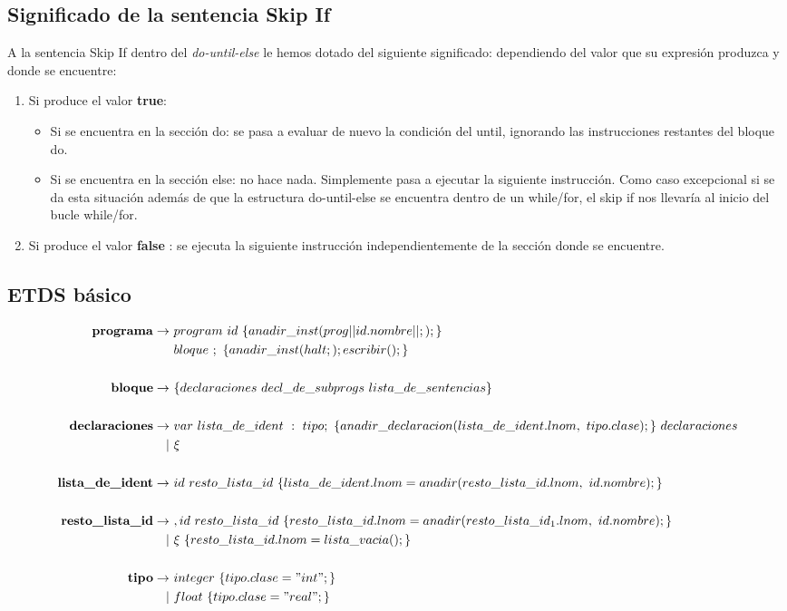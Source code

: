 \documentclass[12pt,a4paper,landscape]{article}
\theoremstyle{mytheor}
\begin{document}
\subsection{Significado de la sentencia Skip If}
A la sentencia Skip If dentro del \textit{do-until-else} le hemos dotado del siguiente significado: dependiendo del valor que su expresión produzca y donde se encuentre:
\begin{enumerate}
\item Si produce el valor \textbf{true}:
    \begin{itemize}
    \item Si se encuentra en la sección do: se pasa a evaluar de nuevo la condición del until, ignorando las instrucciones restantes del bloque do.
    \item Si se encuentra en la sección else: no hace nada. Simplemente pasa a ejecutar la siguiente instrucción. Como caso excepcional si se da esta situación además de que la estructura do-until-else se encuentra dentro de un while/for, el skip if nos llevaría al inicio del bucle while/for.
    \end{itemize}
\item Si produce el valor \textbf{false} : se ejecuta la siguiente instrucción independientemente de la sección donde se encuentre.
\end{enumerate}


\subsection{ETDS básico}
\begin{center}
  \begin{align*}
    \text{\textbf{programa}} \to\ & program\ id\ \{ anadir\_inst( prog|| id.nombre || ;); \}\\
    & bloque\  ;\  \{ anadir\_inst(halt; ); escribir();\}\\\\
    \text{\textbf{ bloque}} \to\ &\{ declaraciones\ decl\_de\_subprogs\ lista\_de\_sentencias \}\\\\
    \text{\textbf{declaraciones}} \to\ & var\ lista\_de\_ident\ :\ tipo;\ \{ anadir\_declaracion(lista\_de\_ident.lnom,\ tipo.clase);\}\ declaraciones\\
    |\ &\xi\\\\
    \text{\textbf{lista\_de\_ident}} \to\ & id\ resto\_lista\_id\ \{lista\_de\_ident.lnom=anadir(resto\_lista\_id.lnom,\ id.nombre);\}\\\\
    \text{\textbf{ resto\_lista\_id}} \to\ & ,id\ resto\_lista\_id\  \{resto\_lista\_id.lnom=anadir(resto\_lista\_id_1.lnom,\ id.nombre);\} \\
    |\ &\xi\ \{resto\_lista\_id.lnom=lista\_vacia();\}\\\\
     \text{\textbf{tipo}} \to\ & integer\ \{tipo.clase="int"; \}\\
    |\ & float\ \{tipo.clase="real"; \}\\\\
  \end{align*}
\end{center}
\end{document}
